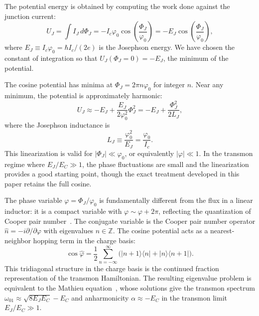 \documentclass[reprint, floatfix, superscriptaddress, amsmath, amssymb, longbibliography]{revtex4-2}
\begin{document}
The potential energy is obtained by computing the work done against the junction current:
\begin{equation}
U_J = \int I_J \, d\Phi_J = -I_c\varphi_0\cos\left(\frac{\Phi_J}{\varphi_0}\right) = -E_J\cos\left(\frac{\Phi_J}{\varphi_0}\right),
\label{eq:josephson_energy}
\end{equation}
where $E_J \equiv I_c\varphi_0 = \hbar I_c/(2e)$ is the Josephson energy. We have chosen the constant of integration so that $U_J(\Phi_J = 0) = -E_J$, the minimum of the potential.

The cosine potential has minima at $\Phi_J = 2\pi n \varphi_0$ for integer $n$. Near any minimum, the potential is approximately harmonic:
\begin{equation}
U_J \approx -E_J + \frac{E_J}{2\varphi_0^2}\Phi_J^2 = -E_J + \frac{\Phi_J^2}{2L_J},
\label{eq:josephson_harmonic}
\end{equation}
where the Josephson inductance is
\begin{equation}
L_J \equiv \frac{\varphi_0^2}{E_J} = \frac{\varphi_0}{I_c}.
\label{eq:josephson_inductance}
\end{equation}
This linearization is valid for $|\Phi_J| \ll \varphi_0$, or equivalently $|\varphi| \ll 1$. In the transmon regime where $E_J/E_C \gg 1$, the phase fluctuations are small and the linearization provides a good starting point, though the exact treatment developed in this paper retains the full cosine.

The phase variable $\varphi = \Phi_J/\varphi_0$ is fundamentally different from the flux in a linear inductor: it is a compact variable with $\varphi \sim \varphi + 2\pi$, reflecting the quantization of Cooper pair number~\cite{Likharev1985, Averin1986}. The conjugate variable is the Cooper pair number operator $\hat{n} = -i\partial/\partial\varphi$ with eigenvalues $n \in \mathbb{Z}$. The cosine potential acts as a nearest-neighbor hopping term in the charge basis:
\begin{equation}
\cos\hat{\varphi} = \frac{1}{2}\sum_{n=-\infty}^{\infty} \big(|n+1\rangle\langle n| + |n\rangle\langle n+1|\big).
\label{eq:cosine_charge_basis}
\end{equation}
This tridiagonal structure in the charge basis is the continued fraction representation of the transmon Hamiltonian. The resulting eigenvalue problem is equivalent to the Mathieu equation~\cite{Koch2007, Cottet2002}, whose solutions give the transmon spectrum $\omega_{01} \approx \sqrt{8E_JE_C} - E_C$ and anharmonicity $\alpha \approx -E_C$ in the transmon limit $E_J/E_C \gg 1$.
\end{document}
